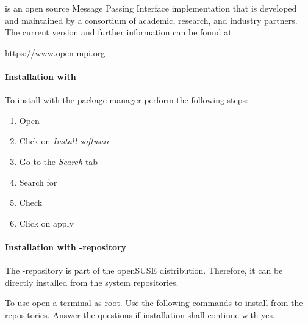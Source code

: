 % 
%               
%          
% 

\leveldown{\marktool{\openmpiname}}

\marktool{\openmpiname} is an open source Message Passing Interface implementation that is developed and maintained by a consortium of academic, research, and industry partners. The current version and further information can be found at

\href{https://www.open-mpi.org}{https://www.open-mpi.org}

\paragraph{Installation with \marktool{\yastname}}

To install \marktool{\openmpiname} with the package manager perform the following steps:

\begin{enumerate}[itemsep=-1.5ex]
 \item Open \marktool{\yastname}
 \item Click on \textit{Install software}
 \item Go to the \textit{Search} tab
 \item Search for \openmpiname
 \item Check \openmpiname
 \item Click on apply
\end{enumerate}

\paragraph{Installation with \marktool{\opensusename}-repository}

The \marktool{\openmpiname}-repository is part of the openSUSE distribution. Therefore, it can be directly installed from the system repositories.

To use \marktool{\zyppername} open a terminal as root. Use the following commands to install  \marktool{\openmpiname} from the repositories. Answer the questions if installation shall continue with yes.

